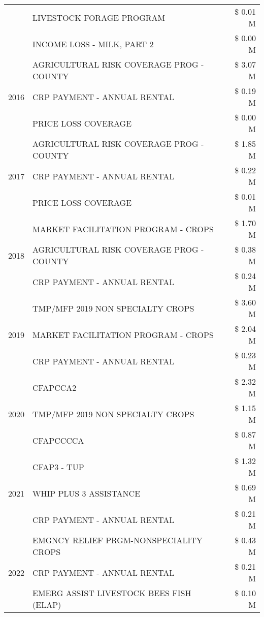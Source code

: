\begin{tabular}{llr}
 & LIVESTOCK FORAGE PROGRAM & \$ 0.01 M \\
 & INCOME LOSS - MILK, PART 2 & \$ 0.00 M \\
\cline{1-3}
\multirow[t]{3}{*}{2016} & AGRICULTURAL RISK COVERAGE PROG - COUNTY & \$ 3.07 M \\
 & CRP PAYMENT - ANNUAL RENTAL & \$ 0.19 M \\
 & PRICE LOSS COVERAGE & \$ 0.00 M \\
\cline{1-3}
\multirow[t]{3}{*}{2017} & AGRICULTURAL RISK COVERAGE PROG - COUNTY & \$ 1.85 M \\
 & CRP PAYMENT - ANNUAL RENTAL & \$ 0.22 M \\
 & PRICE LOSS COVERAGE & \$ 0.01 M \\
\cline{1-3}
\multirow[t]{3}{*}{2018} & MARKET FACILITATION PROGRAM - CROPS & \$ 1.70 M \\
 & AGRICULTURAL RISK COVERAGE PROG - COUNTY & \$ 0.38 M \\
 & CRP PAYMENT - ANNUAL RENTAL & \$ 0.24 M \\
\cline{1-3}
\multirow[t]{3}{*}{2019} & TMP/MFP 2019 NON SPECIALTY CROPS & \$ 3.60 M \\
 & MARKET FACILITATION PROGRAM - CROPS & \$ 2.04 M \\
 & CRP PAYMENT - ANNUAL RENTAL & \$ 0.23 M \\
\cline{1-3}
\multirow[t]{3}{*}{2020} & CFAPCCA2 & \$ 2.32 M \\
 & TMP/MFP 2019 NON SPECIALTY CROPS & \$ 1.15 M \\
 & CFAPCCCCA & \$ 0.87 M \\
\cline{1-3}
\multirow[t]{3}{*}{2021} & CFAP3 - TUP & \$ 1.32 M \\
 & WHIP PLUS 3 ASSISTANCE & \$ 0.69 M \\
 & CRP PAYMENT - ANNUAL RENTAL & \$ 0.21 M \\
\cline{1-3}
\multirow[t]{3}{*}{2022} & EMGNCY RELIEF PRGM-NONSPECIALITY CROPS & \$ 0.43 M \\
 & CRP PAYMENT - ANNUAL RENTAL & \$ 0.21 M \\
 & EMERG ASSIST LIVESTOCK BEES FISH (ELAP) & \$ 0.10 M \\
\cline{1-3}
\bottomrule
\end{tabular}
